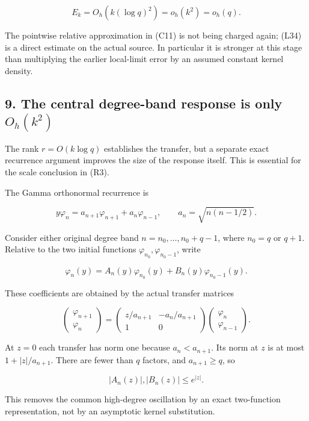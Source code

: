 \[
E_k=O_h(k(\log q)^2)=o_h(k^2)=o_h(q).
\tag{L35}
\]

The pointwise relative approximation in (C11) is not being charged again; (L34) is a direct estimate on the actual source. In particular it is stronger at this stage than multiplying the earlier local-limit error by an assumed constant kernel density.

\subsection{\texorpdfstring{9. The central degree-band response is only \(O_h(k^2)\)}{9. The central degree-band response is only O\_h(k\^{}2)}}\label{loc:the-central-degree-band-response-is-only-o_hk2}

The rank \(r=O(k\log q)\) establishes the transfer, but a separate exact recurrence argument improves the size of the response itself. This is essential for the scale conclusion in (R3).

The Gamma orthonormal recurrence is

\[
y\varphi_n=a_{n+1}\varphi_{n+1}+a_n\varphi_{n-1},\qquad
a_n=\sqrt{n(n-1/2)}.
\tag{L36}
\]

Consider either original degree band \(n=n_0,\ldots,n_0+q-1\), where \(n_0=q\) or \(q+1\). Relative to the two initial functions \(\varphi_{n_0},\varphi_{n_0-1}\), write

\[
\varphi_n(y)=A_n(y)\varphi_{n_0}(y)+B_n(y)\varphi_{n_0-1}(y).
\tag{L37}
\]

These coefficients are obtained by the actual transfer matrices

\[
\begin{pmatrix}\varphi_{n+1}\\\varphi_n\end{pmatrix}
=\begin{pmatrix}z/a_{n+1}&-a_n/a_{n+1}\\1&0\end{pmatrix}
\begin{pmatrix}\varphi_n\\\varphi_{n-1}\end{pmatrix}.
\]

At \(z=0\) each transfer has norm one because \(a_n<a_{n+1}\). Its norm at \(z\) is at most \(1+|z|/a_{n+1}\). There are fewer than \(q\) factors, and \(a_{n+1}\ge q\), so

\[
|A_n(z)|,|B_n(z)|\le e^{|z|}.
\tag{L38}
\]

This removes the common high-degree oscillation by an exact two-function representation, not by an asymptotic kernel substitution.

